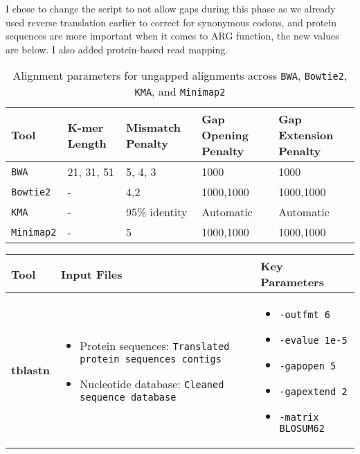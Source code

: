 \documentclass[11pt]{report}
\begin{document}
\begin{itemize}
	\begin{tcolorbox}[title=Note (\today)]
		I chose to change the script to not allow gaps during this phase as we already used reverse translation earlier to correct for synonymous codons, and protein sequences are more important when it comes to ARG function, the new values are below. I also added protein-based read mapping. 
	\end{tcolorbox}


\begin{table}[h!]
	\centering
	\begin{adjustbox}{max width=\linewidth}
		\begin{tabular}{|p{2.5cm}|p{2.5cm}|p{2.5cm}|p{2.5cm}|p{2.5cm}|}
			\hline
			\textbf{Tool} & \textbf{K-mer Length} & \textbf{Mismatch Penalty} & \textbf{Gap Opening Penalty} & \textbf{Gap Extension Penalty} \\ \hline
			\texttt{BWA} & 21, 31, 51 & 5, 4, 3 & 1000 & 1000 \\ \hline
			\texttt{Bowtie2} & - & 4,2 & 1000,1000 & 1000,1000 \\ \hline
			\texttt{KMA} & - & 95\% identity & Automatic & Automatic \\ \hline
			\texttt{Minimap2} & - & 5 & 1000,1000 & 1000,1000 \\ \hline
		\end{tabular}
	\end{adjustbox}
	\caption{Alignment parameters for ungapped alignments across \texttt{BWA}, \texttt{Bowtie2}, \texttt{KMA}, and \texttt{Minimap2}}
	\label{tab:alignment_parameters}
\end{table}
	
	
\begin{table}[h!]
	\centering
	\begin{adjustbox}{max width=\linewidth}
		\begin{tabular}{|p{3cm}|p{4cm}|p{5cm}|}
			\hline
			\textbf{Tool} & \textbf{Input Files} & \textbf{Key Parameters} \\ \hline
			\textbf{tblastn} & 
			\begin{itemize}
				\item Protein sequences: \texttt{Translated protein sequences contigs}
				\item Nucleotide database: \texttt{Cleaned sequence database}
			\end{itemize} 
			& 
			\begin{itemize}
				\item \texttt{-outfmt 6}
				\item \texttt{-evalue 1e-5}
				\item \texttt{-gapopen 5}
				\item \texttt{-gapextend 2}
				\item \texttt{-matrix \texttt{BLOSUM62}}
			\end{itemize} \\ \hline
			

\end{tabular}
\end{adjustbox}
\end{table}
\end{itemize}
\end{document}
